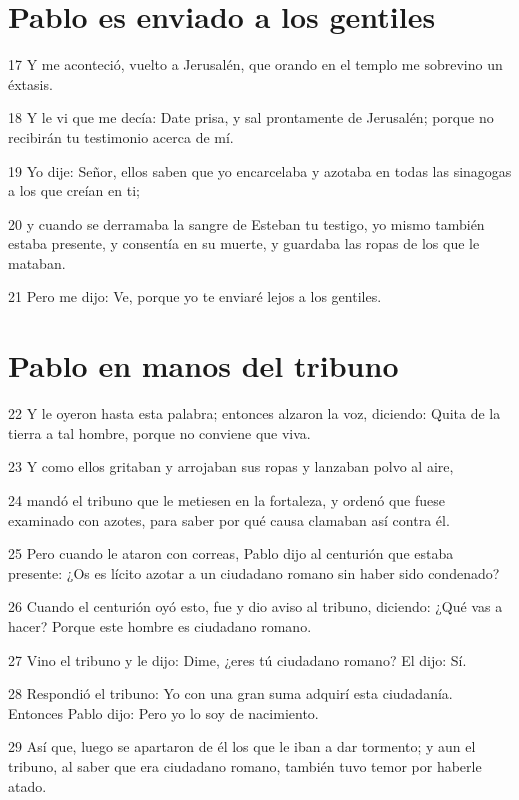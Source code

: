 \section*{Pablo es enviado a los gentiles}

\par 17 Y me aconteció, vuelto a Jerusalén, que orando en el templo me sobrevino un éxtasis.
\par 18 Y le vi que me decía: Date prisa, y sal prontamente de Jerusalén; porque no recibirán tu testimonio acerca de mí.
\par 19 Yo dije: Señor, ellos saben que yo encarcelaba y azotaba en todas las sinagogas a los que creían en ti;
\par 20 y cuando se derramaba la sangre de Esteban tu testigo, yo mismo también estaba presente, y consentía en su muerte, y guardaba las ropas de los que le mataban.
\par 21 Pero me dijo: Ve, porque yo te enviaré lejos a los gentiles.

\section*{Pablo en manos del tribuno}

\par 22 Y le oyeron hasta esta palabra; entonces alzaron la voz, diciendo: Quita de la tierra a tal hombre, porque no conviene que viva.
\par 23 Y como ellos gritaban y arrojaban sus ropas y lanzaban polvo al aire,
\par 24 mandó el tribuno que le metiesen en la fortaleza, y ordenó que fuese examinado con azotes, para saber por qué causa clamaban así contra él.
\par 25 Pero cuando le ataron con correas, Pablo dijo al centurión que estaba presente: ¿Os es lícito azotar a un ciudadano romano sin haber sido condenado?
\par 26 Cuando el centurión oyó esto, fue y dio aviso al tribuno, diciendo: ¿Qué vas a hacer? Porque este hombre es ciudadano romano.
\par 27 Vino el tribuno y le dijo: Dime, ¿eres tú ciudadano romano? El dijo: Sí.
\par 28 Respondió el tribuno: Yo con una gran suma adquirí esta ciudadanía. Entonces Pablo dijo: Pero yo lo soy de nacimiento.
\par 29 Así que, luego se apartaron de él los que le iban a dar tormento; y aun el tribuno, al saber que era ciudadano romano, también tuvo temor por haberle atado.

